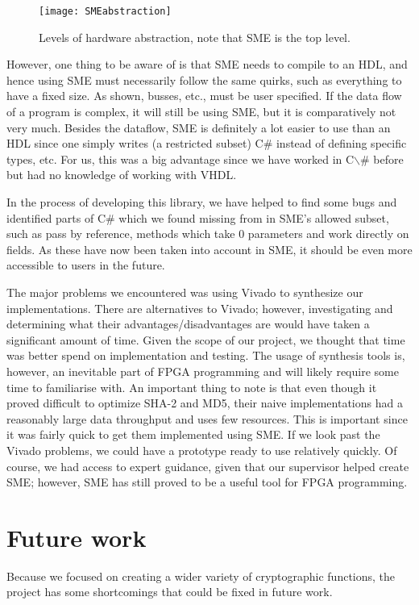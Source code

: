 \documentclass[a4paper, openany]{memoir}
\begin{document}
\begin{abstact}
\begin{figure}[H]
  \centering
  \texttt{[image: SMEabstraction]}
  \caption{Levels of hardware abstraction, note that SME is the top level.}
\end{figure}

However, one thing to be aware of is that SME needs to compile to an HDL, and hence using SME must necessarily follow the same quirks, such as everything to have a fixed size. As shown, busses, etc., must be user specified. If the data flow of a program is complex, it will still be using SME, but it is comparatively not very much. Besides the dataflow, SME is definitely a lot easier to use than an HDL since one simply writes (a restricted subset) C\# instead of defining specific types, etc.
For us, this was a big advantage since we have worked in C$\backslash$# before but had no knowledge of working with VHDL.

In the process of developing this library, we have helped to find some bugs and identified parts of C\# which we found missing from in SME's allowed subset, such as pass by reference, methods which take 0 parameters and work directly on fields. As these have now been taken into account in SME, it should be even more accessible to users in the future.

The major problems we encountered was using Vivado to synthesize our implementations.
There are alternatives to Vivado; however, investigating and determining what their advantages/disadvantages are would have taken a significant amount of time.
Given the scope of our project, we thought that time was better spend on implementation and testing. The usage of synthesis tools is, however, an inevitable part of FPGA programming and will likely require some time to familiarise with. An important thing to note is that even though it proved difficult to optimize SHA-2 and MD5, their naive implementations had a
reasonably large data throughput and uses few resources. This is important since it was fairly quick to get them implemented using SME.
If we look past the Vivado problems, we could have a prototype ready to use relatively quickly.
Of course, we had access to expert guidance, given that our supervisor helped create SME; however, SME has still proved to be a useful tool for FPGA programming.
\section{Future work}
\label{sec:orgf6d819b}
Because we focused on creating a wider variety of cryptographic functions, the project has some shortcomings that could be fixed in future work.\\


\end{abstact}
\end{document}
